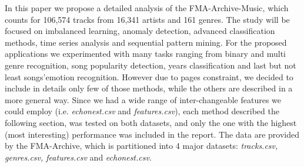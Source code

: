 
In this paper we propose a detailed analysis of the FMA-Archive-Music, which counts for 106,574 tracks from 16,341 artists and 161 genres. 
The study will be focused on imbalanced learning, anomaly detection, advanced classification methods, time series analysis and sequential pattern mining.
For the proposed applications we experimented with many tasks ranging from binary and multi genre recognition, song popularity detection, years classification and last but not least songs'emotion recognition.
However due to pages constraint, we decided to include in details only few of those methods, while the others are described in a more general way.
Since we had a wide range of inter-changeable features we could employ (i.e. \textit{echonest.csv} and \textit{features.csv}), each method described the following section, was tested on both datasets, and only the one with the highest (most interesting) performance was included in the report.
The data are provided by the FMA-Archive, which is partitioned into 4 major datasets: \textit{tracks.csv, genres.csv, features.csv} and \textit{echonest.csv}. 

